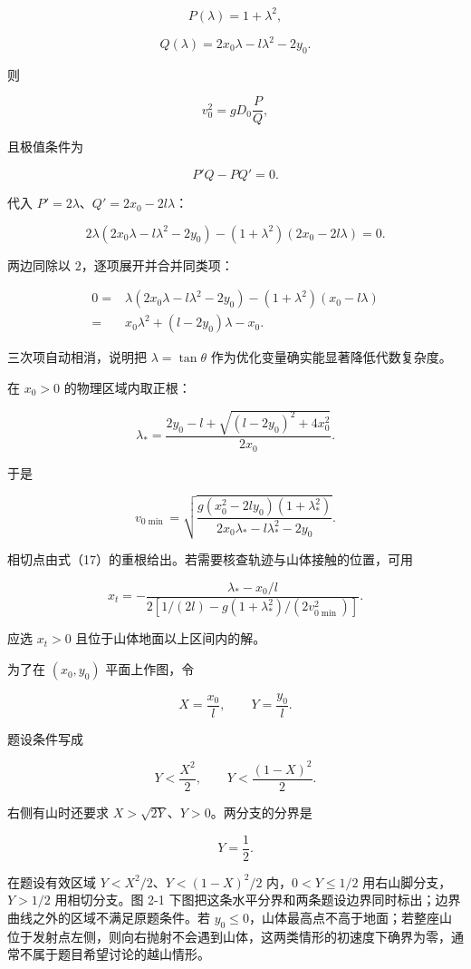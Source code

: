 \documentclass[12pt,a4paper,UTF8]{ctexart}
\begin{document}
\[P(\lambda)=1+\lambda^2,\]

\[Q(\lambda)=2x_0\lambda-l\lambda^2-2y_0.\]

则

\[v_0^2=gD_0\frac{P}{Q},\]

且极值条件为

\[P'Q-PQ'=0.\]

代入 \(P'=2\lambda\)、\(Q'=2x_0-2l\lambda\)：

\[2\lambda(2x_0\lambda-l\lambda^2-2y_0)
-(1+\lambda^2)(2x_0-2l\lambda)=0.\]

两边同除以 \(2\)，逐项展开并合并同类项：

\[\begin{aligned}
0={}&\lambda(2x_0\lambda-l\lambda^2-2y_0)
-(1+\lambda^2)(x_0-l\lambda)\\
={}&x_0\lambda^2+(l-2y_0)\lambda-x_0.
\end{aligned}\]

三次项自动相消，说明把 \(\lambda=\tan\theta\)
作为优化变量确实能显著降低代数复杂度。

在 \(x_0>0\) 的物理区域内取正根：

\[\boxed{
\lambda_*
=\frac{2y_0-l+\sqrt{(l-2y_0)^2+4x_0^2}}{2x_0}
}. \tag{20}\]

于是

\[\boxed{
v_{0\min}
=\sqrt{
\frac{g(x_0^2-2ly_0)(1+\lambda_*^2)}
{2x_0\lambda_*-l\lambda_*^2-2y_0}
}
}. \tag{21}\]

相切点由式（17）的重根给出。若需要核查轨迹与山体接触的位置，可用

\[x_t=-\frac{\lambda_*-x_0/l}
{2\left[1/(2l)-g(1+\lambda_*^2)/(2v_{0\min}^2)\right]}. \tag{22}\]

应选 \(x_t>0\) 且位于山体地面以上区间内的解。

为了在 \((x_0,y_0)\) 平面上作图，令

\[X=\frac{x_0}{l},\qquad Y=\frac{y_0}{l}.\]

题设条件写成

\[Y<\frac{X^2}{2},\qquad Y<\frac{(1-X)^2}{2}. \tag{23}\]

右侧有山时还要求 \(X>\sqrt{2Y}\)、\(Y>0\)。两分支的分界是

\[\boxed{Y=\frac12}. \tag{24}\]

在题设有效区域 \(Y<X^2/2\)、\(Y<(1-X)^2/2\) 内，\(0<Y\le1/2\)
用右山脚分支，\(Y>1/2\) 用相切分支。图 2-1
下图把这条水平分界和两条题设边界同时标出；边界曲线之外的区域不满足原题条件。若
\(y_0\leq0\)，山体最高点不高于地面；若整座山位于发射点左侧，则向右抛射不会遇到山体，这两类情形的初速度下确界为零，通常不属于题目希望讨论的越山情形。
\end{document}
